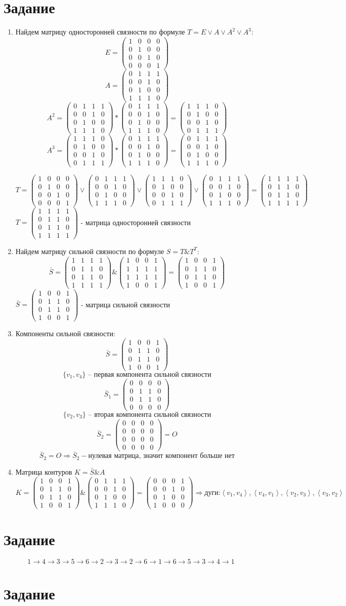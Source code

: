 \documentclass[a4paper, 12pt]{article}
\newcommand{\RNum}[1]{\uppercase\expandafter{\romannumeral #1\relax}}
\newcommand{\E}{\begin{pmatrix}
    1 & 0 & 0 & 0 \\
    0 & 1 & 0 & 0 \\
    0 & 0 & 1 & 0 \\
    0 & 0 & 0 & 1
\end{pmatrix}} %
\newcommand{\A}{\begin{pmatrix}
    0 & 1 & 1 & 1 \\
    0 & 0 & 1 & 0 \\
    0 & 1 & 0 & 0 \\
    1 & 1 & 1 & 0
\end{pmatrix}} %
\newcommand{\Apowtwo}{\begin{pmatrix}
    1 & 1 & 1 & 0 \\
    0 & 1 & 0 & 0 \\
    0 & 0 & 1 & 0 \\
    0 & 1 & 1 & 1
\end{pmatrix}} %
\newcommand{\T}{\begin{pmatrix}
    1 & 1 & 1 & 1\\
    0 & 1 & 1 & 0\\
    0 & 1 & 1 & 0\\
    1 & 1 & 1 & 1
\end{pmatrix}} %
\newcommand{\Smatrix}{\begin{pmatrix}
    1 & 0 & 0 & 1\\
    0 & 1 & 1 & 0\\
    0 & 1 & 1 & 0\\
    1 & 0 & 0 & 1
\end{pmatrix}} %
\newcommand{\Sone}{\begin{pmatrix}
    0 & 0 & 0 & 0\\
    0 & 1 & 1 & 0\\
    0 & 1 & 1 & 0\\
    0 & 0 & 0 & 0
\end{pmatrix}} %
\newcommand{\Omatrix}{\begin{pmatrix}
    0 & 0 & 0 & 0\\
    0 & 0 & 0 & 0\\
    0 & 0 & 0 & 0\\
    0 & 0 & 0 & 0
\end{pmatrix}} %
\newcommand{\K}{
    \begin{pmatrix}
        0 & 0 & 0 & 1\\
        0 & 0 & 1 & 0\\
        0 & 1 & 0 & 0\\
        1 & 0 & 0 & 0
    \end{pmatrix}
}
\begin{document}
\section{Задание \RNum{1}}
\begin{enumerate}[label=\asbuk*)]
    \item Найдем матрицу односторонней связности по формуле $ T = E \vee A \vee A^2 \vee A^3$:
    $$ E = \E $$
    $$
    A = \A
    $$
    $$
    A^2 = \A \ast \A = \Apowtwo
    $$
    $$
    A^3 = \Apowtwo \ast \A = \A
    $$

    $$
    T = \E \vee \A \vee \Apowtwo \vee \A = \T
    $$
    $ T = \T$ - матрица односторонней связности
    \item Найдем матрицу сильной связности по формуле $ S = T \& T^T$:
    $$ \bar{S} = \T \& 
    \begin{pmatrix}
        1 & 0 & 0 & 1\\
        1 & 1 & 1 & 1\\
        1 & 1 & 1 & 1\\
        1 & 0 & 0 & 1
    \end{pmatrix} = \Smatrix
    $$
    $ \bar{S} = \Smatrix$ - матрица сильной связности
    
    \item Компоненты сильной связности:
    $$ \bar{S} = \Smatrix $$
    $$ \{v_1, v_4\} \text{ -- первая компонента сильной связности} $$
    $$ \bar{S}_1  = \Sone $$
    $$ \{v_2, v_3\} \text{ -- вторая компонента сильной связности}$$
    $$ \bar{S}_2 = \Omatrix = O $$
    $$ \bar{S}_2 = O \Rightarrow \bar{S}_2 - \text{нулевая матрица, значит компонент больше нет} $$
    \item Матрица контуров $ K = \bar{S} \& A $
    $$ K = \Smatrix \& \A = \K \Rightarrow \text{дуги:} \left<v_1,v_4\right>, \left<v_4,v_1\right>, \left<v_2,v_3\right>, \left<v_3,v_2\right>$$
\end{enumerate}

\section{Задание \RNum{2}} 
$$ 1 \rightarrow 4 \rightarrow 3 \rightarrow 5 \rightarrow 6 \rightarrow 2 \rightarrow 3 \rightarrow 2 \rightarrow 6 \rightarrow 1 \rightarrow 6 \rightarrow 5 \rightarrow 3 \rightarrow 4 \rightarrow 1$$

\section{Задание \RNum{3}}
\end{document}
